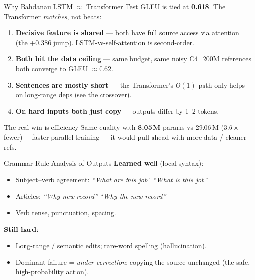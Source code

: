 \documentclass[aspectratio=169,11pt]{beamer}
\begin{document}
\begin{frame}{Why Bahdanau LSTM $\approx$ Transformer}
Test GLEU is tied at \textbf{0.618}. The Transformer \emph{matches}, not beats:
\begin{enumerate}
  \item \textbf{Decisive feature is shared} --- both have full source access via
        attention (the +0.386 jump). LSTM-vs-self-attention is second-order.
  \item \textbf{Both hit the data ceiling} --- same budget, same noisy C4\_200M
        references \textrightarrow{} both converge to GLEU $\approx$0.62.
  \item \textbf{Sentences are mostly short} --- the Transformer's $O(1)$ path
        only helps on long-range deps (see the crossover).
  \item \textbf{On hard inputs both just copy} --- outputs differ by 1--2 tokens.
\end{enumerate}
\begin{block}{The real win is efficiency}
Same quality with \textbf{8.05\,M} params vs 29.06\,M ($3.6\times$ fewer) +
faster parallel training --- it would pull ahead with more data / cleaner refs.
\end{block}
\end{frame}

\begin{frame}{Grammar-Rule Analysis of Outputs}
\textbf{Learned well} (local syntax):
\begin{itemize}\small
  \item Subject--verb agreement: \emph{``What are this job''} \textrightarrow{} \emph{``What is this job''}
  \item Articles: \emph{``Why new record''} \textrightarrow{} \emph{``Why the new record''}
  \item Verb tense, punctuation, spacing.
\end{itemize}
\vspace{0.4em}
\textbf{Still hard:}
\begin{itemize}\small
  \item Long-range / semantic edits; rare-word spelling (hallucination).
  \item Dominant failure = \emph{under-correction}: copying the source unchanged
        (the safe, high-probability action).
\end{itemize}
\end{frame}
\end{document}
